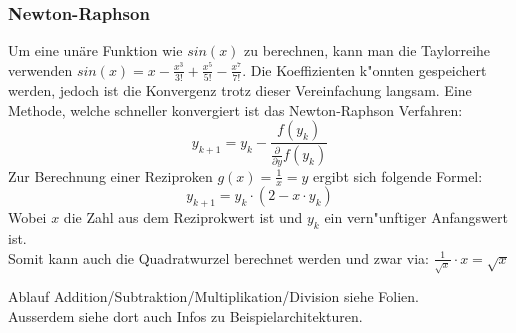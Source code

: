 \subsubsection{Newton-Raphson}
Um eine unäre Funktion wie $sin(x)$ zu berechnen, kann man die Taylorreihe verwenden $sin(x) = x - \frac{x^3}{3!} + \frac{x^5}{5!} - \frac{x^7}{7!}$. Die Koeffizienten k"onnten gespeichert werden, jedoch ist die Konvergenz trotz dieser Vereinfachung langsam. 
Eine Methode, welche schneller konvergiert ist das Newton-Raphson Verfahren: 
\begin{equation}
y_{k+1} = y_k - \frac{f(y_k)}{\frac{\partial}{\partial y}f(y_k)}
\end{equation}
Zur Berechnung einer Reziproken $g(x)=\frac{1}{x}=y$ ergibt sich folgende Formel: 
\begin{equation}
y_{k+1} = y_k\cdot (2-x\cdot y_k)
\end{equation}
Wobei $x$ die Zahl aus dem Reziprokwert ist und $y_k$ ein vern"unftiger Anfangswert ist. \\

Somit kann auch die Quadratwurzel berechnet werden und zwar via: $\frac{1}{\sqrt{x}} \cdot x = \sqrt{x}$

Ablauf Addition/Subtraktion/Multiplikation/Division siehe Folien.\\
Ausserdem siehe dort auch Infos zu Beispielarchitekturen.


